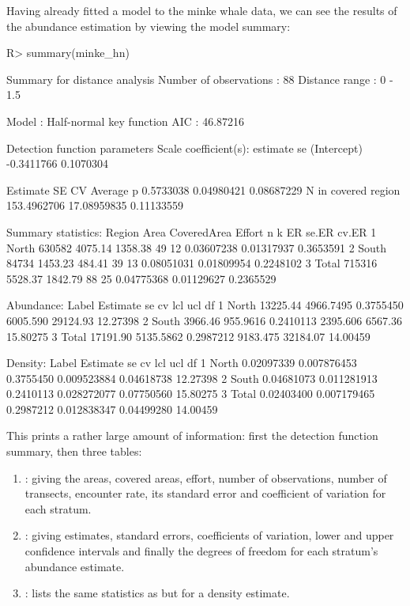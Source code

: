 \documentclass[article]{jss}\usepackage[]{graphicx}\usepackage[]{color}
\begin{document}
Having already fitted a model to the minke whale data, we can see the results of the abundance estimation by viewing the model summary:
\begin{Schunk}
\begin{Sinput}
R> summary(minke_hn)
\end{Sinput}
\begin{Soutput}

Summary for distance analysis 
Number of observations :  88 
Distance range         :  0  -  1.5 

Model : Half-normal key function 
AIC   : 46.87216 

Detection function parameters
Scale coefficient(s):  
              estimate        se
(Intercept) -0.3411766 0.1070304

                       Estimate          SE         CV
Average p             0.5733038  0.04980421 0.08687229
N in covered region 153.4962706 17.08959835 0.11133559

Summary statistics:
  Region   Area CoveredArea  Effort  n  k         ER      se.ER     cv.ER
1  North 630582     4075.14 1358.38 49 12 0.03607238 0.01317937 0.3653591
2  South  84734     1453.23  484.41 39 13 0.08051031 0.01809954 0.2248102
3  Total 715316     5528.37 1842.79 88 25 0.04775368 0.01129627 0.2365529

Abundance:
  Label Estimate        se        cv      lcl      ucl       df
1 North 13225.44 4966.7495 0.3755450 6005.590 29124.93 12.27398
2 South  3966.46  955.9616 0.2410113 2395.606  6567.36 15.80275
3 Total 17191.90 5135.5862 0.2987212 9183.475 32184.07 14.00459

Density:
  Label   Estimate          se        cv         lcl        ucl       df
1 North 0.02097339 0.007876453 0.3755450 0.009523884 0.04618738 12.27398
2 South 0.04681073 0.011281913 0.2410113 0.028272077 0.07750560 15.80275
3 Total 0.02403400 0.007179465 0.2987212 0.012838347 0.04499280 14.00459
\end{Soutput}
\end{Schunk}
This prints a rather large amount of information: first the detection function summary, then three tables:

\begin{enumerate}
\item {}: giving the areas, covered areas, effort, number of observations, number of transects, encounter rate, its standard error and coefficient of variation for each stratum. 
\item {}: giving estimates, standard errors, coefficients of variation, lower and upper confidence intervals and finally the degrees of freedom for each stratum's abundance estimate.
\item {}: lists the same statistics as  but for a density estimate.
\end{enumerate}
\end{document}
